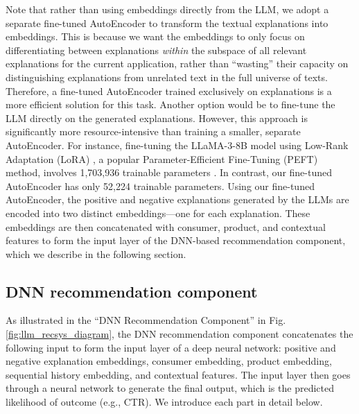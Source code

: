 Note that rather than using embeddings directly from the LLM, we adopt a separate fine-tuned AutoEncoder to transform the textual explanations into embeddings. This is because we want the embeddings to only focus on differentiating between explanations \emph{within} the subspace of all relevant explanations for the current application, rather than ``wasting'' their capacity on distinguishing explanations from unrelated text in the full universe of texts. Therefore, a fine-tuned AutoEncoder trained exclusively on explanations is a more efficient solution for this task. Another option would be to fine-tune the LLM directly on the generated explanations. However, this approach is significantly more resource-intensive than training a smaller, separate AutoEncoder. For instance, fine-tuning the LLaMA-3-8B model using Low-Rank Adaptation (LoRA) \citep{hu2021lora}, a popular Parameter-Efficient Fine-Tuning (PEFT) method, involves 1,703,936 trainable parameters \citep{ye2024lola}. In contrast, our fine-tuned AutoEncoder has only 52,224 trainable parameters.
Using our fine-tuned AutoEncoder, the positive and negative explanations generated by the LLMs are encoded into two distinct embeddings—one for each explanation. These embeddings are then concatenated with consumer, product, and contextual features to form the input layer of the DNN-based recommendation component, which we describe in the following section. 


\subsection{DNN recommendation component}
\label{sec:framework_dnn}  

As illustrated in the ``DNN Recommendation Component'' in Fig.\ref{fig:llm_recsys_diagram}, the DNN recommendation component concatenates the following input to form the input layer of a deep neural network: positive and negative explanation embeddings, consumer embedding, product embedding, sequential history embedding, and contextual features. The input layer then goes through a neural network to generate the final output, which is the predicted likelihood of outcome (e.g., CTR). We introduce each part in detail below. 

